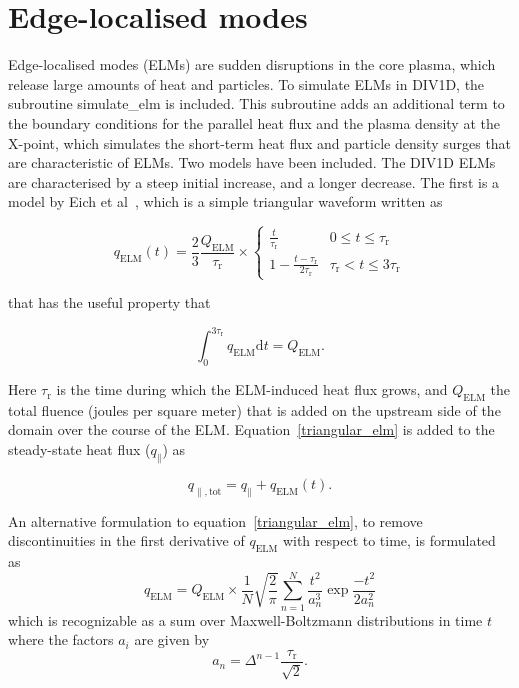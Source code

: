 \documentclass[amsmath,amssymb,a4]{revtex4-2}
\begin{document}
\section{Edge-localised modes}
\label{section:elms}

Edge-localised modes (ELMs) are sudden disruptions in the core plasma, which release large amounts of heat and particles. To simulate ELMs in DIV1D, the subroutine simulate\_elm is included. This subroutine adds an additional term to the boundary conditions for the parallel heat flux and the plasma density at the X-point, which simulates the short-term  heat flux and particle density surges that are characteristic of ELMs. Two models have been included. The DIV1D ELMs are characterised by a steep initial increase, and a longer decrease. The first is a model by Eich et al~\cite{eich2017}, which is a simple triangular waveform written as

\begin{equation}
\label{triangular_elm}
q_{\mathrm{ELM}}(t)=\frac{2}{3}\frac{Q_{\mathrm{ELM}}}{\tau_{\mathrm{r}}}\times
\left\{
\begin{matrix}
\frac{t}{\tau_{\mathrm{\mathrm{r}}}} &
0 \leq t \leq \tau_{\mathrm{r}} \\
1-\frac{t-\tau_{\mathrm{r}}}{2\tau_{\mathrm{r}}} &
\tau_{\mathrm{r}} < t \leq 3\tau_{\mathrm{r}}
\end{matrix}
\right.
\end{equation}

that has the useful property that

\begin{equation}
\int_{0}^{3\tau_{\mathrm{r}}} q_{\mathrm{ELM}} \mathrm{d}t=Q_{\mathrm{ELM}}.
\end{equation}

Here $\tau_{\mathrm{r}}$ is the time during which the ELM-induced heat flux grows, and $Q_{\mathrm{ELM}}$ the total fluence (joules per square meter) that is added on the upstream side of the domain over the course of the ELM. Equation~\ref{triangular_elm} is added to the steady-state heat flux ($q_{\parallel}$) as

\begin{equation}
\label{elm_boundary_condition}
q_{\parallel,\mathrm{tot}}=q_{\parallel}+q_{\mathrm{ELM}}(t).
\end{equation}

An alternative formulation to equation~\ref{triangular_elm}, to remove discontinuities in the first derivative of $q_{\mathrm{ELM}}$ with respect to time, is formulated as
\begin{equation}
\label{maxwell_boltzmann_elm}
q_{\mathrm{ELM}} = Q_{\mathrm{ELM}}\times
\frac{1}{N}\sqrt{\frac{2}{\pi}}
\sum_{n=1}^{N} \frac{t^2}{a_{n}^3}\exp{\frac{-t^2}{2a_n^2}}
\end{equation}
which is recognizable as a sum over Maxwell-Boltzmann distributions in time $t$ where the factors $a_i$ are given by
\begin{equation}
\label{maxwell_boltzmann_elm_a}
a_n = \Delta^{n-1}\frac{\tau_{\mathrm{r}}}{\sqrt{2}}.
\end{equation}
\end{document}
